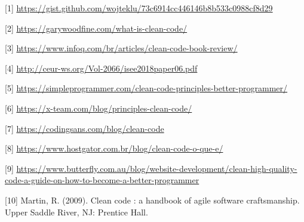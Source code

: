 \documentclass[10pt,portuguese]{article}
\begin{document}




\vspace{5mm} %

[1] \url{https://gist.github.com/wojteklu/73c6914cc446146b8b533c0988cf8d29}

[2] \url{https://garywoodfine.com/what-is-clean-code/}

[3] \url{https://www.infoq.com/br/articles/clean-code-book-review/}

[4] \url{http://ceur-ws.org/Vol-2066/isee2018paper06.pdf}

[5] \url{https://simpleprogrammer.com/clean-code-principles-better-programmer/}

[6] \url{https://x-team.com/blog/principles-clean-code/}

[7] \url{https://codingsans.com/blog/clean-code}

[8] \url{https://www.hostgator.com.br/blog/clean-code-o-que-e/}

[9] \url{https://www.butterfly.com.au/blog/website-development/clean-high-quality-code-a-guide-on-how-to-become-a-better-programmer}

[10] Martin, R. (2009). Clean code : a handbook of agile software craftsmanship. Upper Saddle River, NJ: Prentice Hall.
\end{document}
